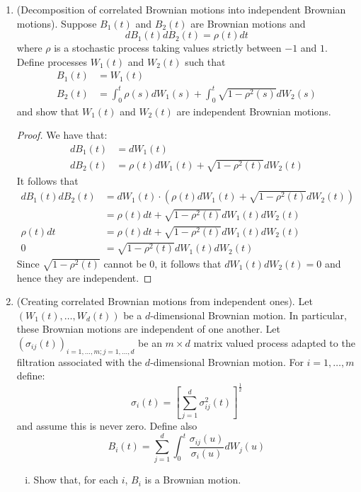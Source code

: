 \documentclass{article}
\makeatletter
\newcommand{\mylabel}[2]{#2\def\@currentlabel{#2}\label{#1}}
\newcommand{\pr}[1]{ \item[\mylabel{}{#1.}]}
\theoremstyle{definition}
\theoremstyle{definition}
\makeatother
\begin{document}
\begin{enumerate}
    \pr{4.13} (Decomposition of correlated Brownian motions into independent Brownian motions). Suppose $B_1(t)$ and $B_2(t)$ are Brownian motions and
    $$ dB_1(t)dB_2(t) = \rho(t)dt$$
    where $\rho$ is a stochastic process taking values strictly between $-1$ and $1$. Define processes $W_1(t)$ and $W_2(t)$ such that
    \begin{align*}
        B_1(t) &= W_1(t) \\
        B_2(t) &= \int_0^t \rho(s) dW_1(s) + \int_0^t \sqrt{1-\rho^2(s)}dW_2(s)
    \end{align*}
    and show that $W_1(t)$ and $W_2(t)$ are independent Brownian motions.
    
    \begin{proof}
    We have that:
    \begin{align*}
        dB_1(t) &= dW_1(t) \\
        dB_2(t) &= \rho(t)dW_1(t) + \sqrt{1-\rho^2(t)}dW_2(t)
    \end{align*}
It follows that
\begin{align*}
    dB_1(t)dB_2(t) &= dW_1(t) \cdot \left( \rho(t)dW_1(t) + \sqrt{1-\rho^2(t)}dW_2(t) \right) \\
    &= 
    \rho(t)dt + \sqrt{1-\rho^2(t)}dW_1(t)dW_2(t) \\
   \rho(t)dt &= \rho(t)dt + \sqrt{1-\rho^2(t)}dW_1(t)dW_2(t) \\
   0 &= \sqrt{1-\rho^2(t)}dW_1(t)dW_2(t)
\end{align*}    
Since $\sqrt{1-\rho^2(t)}$ cannot be $0$, it follows that $dW_1(t)dW_2(t)=0$ and hence they are independent.
    \end{proof}
    
    \pr{4.15} (Creating correlated Brownian motions from independent ones). Let $(W_1(t),\ldots,W_d(t))$ be a $d$-dimensional Brownian motion. In particular, these Brownian motions are independent of one another. Let $(\sigma_{ij}(t))_{i=1,\ldots,m;j=1,\ldots,d}$ be an $m \times d$ matrix valued process adapted to the filtration associated with the $d$-dimensional Brownian motion. For $i=1,\ldots,m$ define:
    $$ \sigma_i(t) = \left[ \sum_{j=1}^d \sigma_{ij}^2(t) \right]^{\frac{1}{2}}$$
    and assume this is never zero. Define also
    $$ B_i(t) = \sum_{j=1}^d \int_0^t \frac{\sigma_{ij}(u)}{\sigma_i(u)}dW_j(u)$$
    
    \begin{enumerate}[(i)]
        \item Show that, for each $i$, $B_i$ is a Brownian motion.
        

\end{enumerate}
\end{enumerate}
\end{document}
